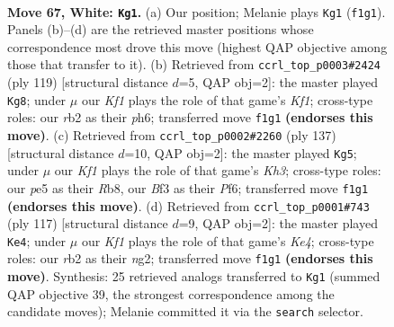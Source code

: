 \documentclass[11pt]{article}
\begin{document}
\clearpage

\begin{figure}[p]\centering
\begin{subfigure}{0.46\textwidth}\centering
\resizebox{\linewidth}{!}{%
\newchessgame
\chessboard[
  setfen={8/4k3/8/4p1p1/5p2/5B2/1r6/5K2 w - - 45 67},
  showmover=false,
  pgfstyle=straightmove, color=movearrow, markmove={f1-g1}
]}
\caption{}
\end{subfigure}\hfill
\begin{subfigure}{0.46\textwidth}\centering
\resizebox{\linewidth}{!}{%
\newchessgame
\chessboard[
  setfen={5k2/8/4K2P/6P1/5P2/8/1b6/8 b - - 0 60},
  showmover=false,
  pgfstyle=straightmove, color=movearrow, markmove={f8-g8}
]}
\caption{}
\end{subfigure}
\\[4pt]
\begin{subfigure}{0.46\textwidth}\centering
\resizebox{\linewidth}{!}{%
\newchessgame
\chessboard[
  setfen={1r6/R7/5p1k/5P2/6P1/8/6K1/8 b - - 0 69},
  showmover=false,
  pgfstyle=straightmove, color=movearrow, markmove={h6-g5}
]}
\caption{}
\end{subfigure}\hfill
\begin{subfigure}{0.46\textwidth}\centering
\resizebox{\linewidth}{!}{%
\newchessgame
\chessboard[
  setfen={8/8/8/4k1b1/6P1/7P/4K1N1/8 b - - 0 59},
  showmover=false,
  pgfstyle=straightmove, color=movearrow, markmove={e5-e4}
]}
\caption{}
\end{subfigure}
\caption{\textbf{Move 67, White: \texttt{Kg1}.} (a) Our position; Melanie plays \texttt{Kg1} (\texttt{f1g1}). Panels (b)--(d) are the retrieved master positions whose correspondence most drove this move (highest QAP objective among those that transfer to it). (b) Retrieved from \texttt{ccrl\_top\_p0003\#2424} (ply 119) [structural distance $d$=5, QAP obj=2]: the master played \texttt{Kg8}; under $\mu$ our \emph{Kf1} plays the role of that game's \emph{Kf1}; cross-type roles: our \emph{r}b2 as their \emph{p}h6; transferred move \texttt{f1g1} \textbf{(endorses this move)}. (c) Retrieved from \texttt{ccrl\_top\_p0002\#2260} (ply 137) [structural distance $d$=10, QAP obj=2]: the master played \texttt{Kg5}; under $\mu$ our \emph{Kf1} plays the role of that game's \emph{Kh3}; cross-type roles: our \emph{p}e5 as their \emph{R}b8, our \emph{B}f3 as their \emph{P}f6; transferred move \texttt{f1g1} \textbf{(endorses this move)}. (d) Retrieved from \texttt{ccrl\_top\_p0001\#743} (ply 117) [structural distance $d$=9, QAP obj=2]: the master played \texttt{Ke4}; under $\mu$ our \emph{Kf1} plays the role of that game's \emph{Ke4}; cross-type roles: our \emph{r}b2 as their \emph{n}g2; transferred move \texttt{f1g1} \textbf{(endorses this move)}. Synthesis: 25 retrieved analogs transferred to \texttt{Kg1} (summed QAP objective 39, the strongest correspondence among the candidate moves); Melanie committed it via the \texttt{search} selector.}
\label{fig:thought-m132}
\end{figure}
\end{document}
